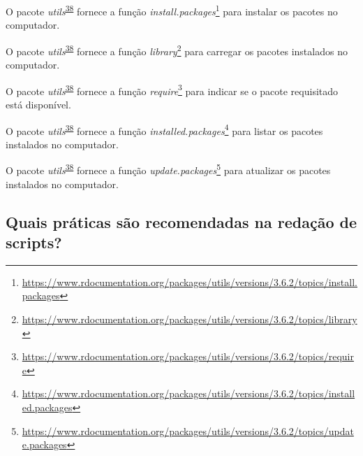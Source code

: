 \documentclass[
  a4paper,
]{book}
\renewcommand{\href}[2]{#2\footnote{\url{#1}}}
\newenvironment{infobox}[1]
  {
  \begin{itemize}
  \renewcommand{\labelitemi}{
    \raisebox{-.7\height}[0pt][0pt]{
      {\setkeys{Gin}{width=3em,keepaspectratio}
        \texttt{[image: \#1]}}
    }
  }
  \setlength{\fboxsep}{1em}
  \begin{blackbox}
  \item
  }
  {
  \end{blackbox}
  \end{itemize}
  }
\begin{document}
\begin{infobox}{images/Rlogo}
O pacote \emph{utils}\textsuperscript{\protect\hyperlink{ref-utils}{38}} fornece a função \href{https://www.rdocumentation.org/packages/utils/versions/3.6.2/topics/install.packages}{\emph{install.packages}} para instalar os pacotes no computador.

\end{infobox}

\begin{infobox}{images/Rlogo}
O pacote \emph{utils}\textsuperscript{\protect\hyperlink{ref-utils}{38}} fornece a função \href{https://www.rdocumentation.org/packages/utils/versions/3.6.2/topics/library}{\emph{library}} para carregar os pacotes instalados no computador.

\end{infobox}

\begin{infobox}{images/Rlogo}
O pacote \emph{utils}\textsuperscript{\protect\hyperlink{ref-utils}{38}} fornece a função \href{https://www.rdocumentation.org/packages/utils/versions/3.6.2/topics/require}{\emph{require}} para indicar se o pacote requisitado está disponível.

\end{infobox}

\begin{infobox}{images/Rlogo}
O pacote \emph{utils}\textsuperscript{\protect\hyperlink{ref-utils}{38}} fornece a função \href{https://www.rdocumentation.org/packages/utils/versions/3.6.2/topics/installed.packages}{\emph{installed.packages}} para listar os pacotes instalados no computador.

\end{infobox}

\begin{infobox}{images/Rlogo}
O pacote \emph{utils}\textsuperscript{\protect\hyperlink{ref-utils}{38}} fornece a função \href{https://www.rdocumentation.org/packages/utils/versions/3.6.2/topics/update.packages}{\emph{update.packages}} para atualizar os pacotes instalados no computador.

\end{infobox}

\hypertarget{quais-pruxe1ticas-suxe3o-recomendadas-na-redauxe7uxe3o-de-scripts}{%
\subsection{Quais práticas são recomendadas na redação de scripts?}\label{quais-pruxe1ticas-suxe3o-recomendadas-na-redauxe7uxe3o-de-scripts}}
\end{document}
